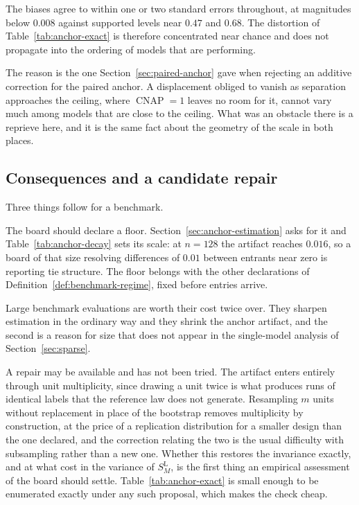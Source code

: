 \documentclass[11pt]{article}
\newcommand{\CNAP}{\operatorname{CNAP}}
\newcommand{\SLead}{S^{\mathrm{L}}}
\theoremstyle{remark}
\begin{document}
The biases agree to within one or two standard errors throughout, at magnitudes below $0.008$ against supported levels near $0.47$ and $0.68$. The distortion of Table~\ref{tab:anchor-exact} is therefore concentrated near chance and does not propagate into the ordering of models that are performing.

The reason is the one Section~\ref{sec:paired-anchor} gave when rejecting an additive correction for the paired anchor. A displacement obliged to vanish as separation approaches the ceiling, where $\CNAP=1$ leaves no room for it, cannot vary much among models that are close to the ceiling. What was an obstacle there is a reprieve here, and it is the same fact about the geometry of the scale in both places.

\subsection{Consequences and a candidate repair}

Three things follow for a benchmark.

The board should declare a floor. Section~\ref{sec:anchor-estimation} asks for it and Table~\ref{tab:anchor-decay} sets its scale: at $n=128$ the artifact reaches $0.016$, so a board of that size resolving differences of $0.01$ between entrants near zero is reporting tie structure. The floor belongs with the other declarations of Definition~\ref{def:benchmark-regime}, fixed before entries arrive.

Large benchmark evaluations are worth their cost twice over. They sharpen estimation in the ordinary way and they shrink the anchor artifact, and the second is a reason for size that does not appear in the single-model analysis of Section~\ref{sec:sparse}.

A repair may be available and has not been tried. The artifact enters entirely through unit multiplicity, since drawing a unit twice is what produces runs of identical labels that the reference law does not generate. Resampling $m$ units without replacement in place of the bootstrap removes multiplicity by construction, at the price of a replication distribution for a smaller design than the one declared, and the correction relating the two is the usual difficulty with subsampling rather than a new one. Whether this restores the invariance exactly, and at what cost in the variance of $\SLead_M$, is the first thing an empirical assessment of the board should settle. Table~\ref{tab:anchor-exact} is small enough to be enumerated exactly under any such proposal, which makes the check cheap.
\end{document}
